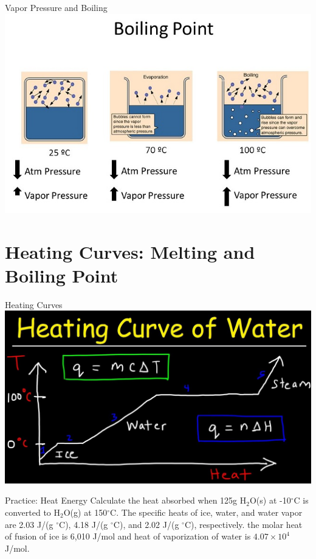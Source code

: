 \documentclass[11pt]{beamer}
\begin{document}
\begin{frame}{Vapor Pressure and Boiling}
  \centering
  \includegraphics[width=\linewidth,trim={0 0 0 1in},clip]{boiling_vapor}
\end{frame}

\section{Heating Curves: Melting and Boiling Point}

\begin{frame}{Heating Curves}
  \centering
  \includegraphics[width=\linewidth]{heating_curve_h2o}
\end{frame}

\begin{frame}{Practice: Heat Energy}
  Calculate the heat absorbed when 125g H$_2$O(s) at -10$^\circ$C
  is converted to H$_2$O(g) at 150$^\circ$C. The specific heats of ice,
  water, and water vapor are 2.03 J/(g $^\circ$C), 4.18 J/(g $^\circ$C),
  and 2.02 J/(g $^\circ$C), respectively. the molar heat of fusion of ice
  is 6,010 J/mol and heat of vaporization of water is $4.07 \times 10^4$
  J/mol.
  \vspace{1.4in}
\end{frame}
\end{document}
